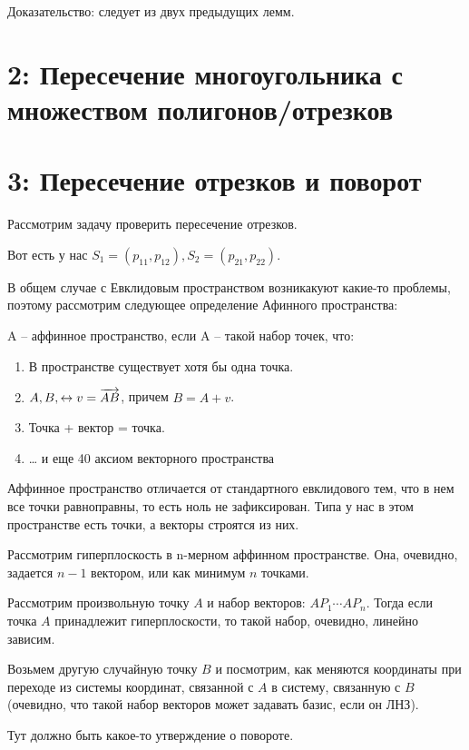 \documentclass[11pt]{article}
\begin{document}
Доказательство: следует из двух предыдущих лемм.
\section{{\bfseries{}} 2:  Пересечение многоугольника с множеством полигонов/отрезков}
\label{sec:orgheadline17}
\section{{\bfseries{}} 3:  Пересечение отрезков и поворот}
\label{sec:orgheadline18}
Рассмотрим задачу проверить пересечение отрезков.

Вот есть у нас \(S_{1}=(p_{11},p_{12}), S_{2}=(p_{21},p_{22})\).

В общем случае с Евклидовым пространством возникакуют какие-то
проблемы, поэтому рассмотрим следующее определение Афинного
пространства:

A -- аффинное пространство, если A -- такой набор точек, что:
\begin{enumerate}
\item В пространстве существует хотя бы одна точка.
\item \(A, B, \leftrightarrow v = \overrightarrow{A B}\), причем \(B = A + v\).
\item Точка + вектор = точка.
\item \ldots{} и еще 40 аксиом векторного пространства
\end{enumerate}

Аффинное пространство отличается от стандартного евклидового тем,
что в нем все точки равноправны, то есть ноль не зафиксирован. Типа
у нас в этом пространстве есть точки, а векторы строятся из них.

Рассмотрим гиперплоскость в n-мерном аффинном пространстве. Она,
очевидно, задается \(n-1\) вектором, или как минимум \(n\) точками.

Рассмотрим произвольную точку \(A\) и набор векторов: \(AP_1 \cdots
  AP_n\). Тогда если точка \(A\) принадлежит гиперплоскости, то такой
набор, очевидно, линейно зависим.

Возьмем другую случайную точку \(B\) и посмотрим, как меняются
координаты при переходе из системы координат, связанной с \(A\) в
систему, связанную с \(B\) (очевидно, что такой набор векторов может
задавать базис, если он ЛНЗ).

\begin{thm}[О повороте]
Тут должно быть какое-то утверждение о повороте.
\end{thm}
\end{document}
